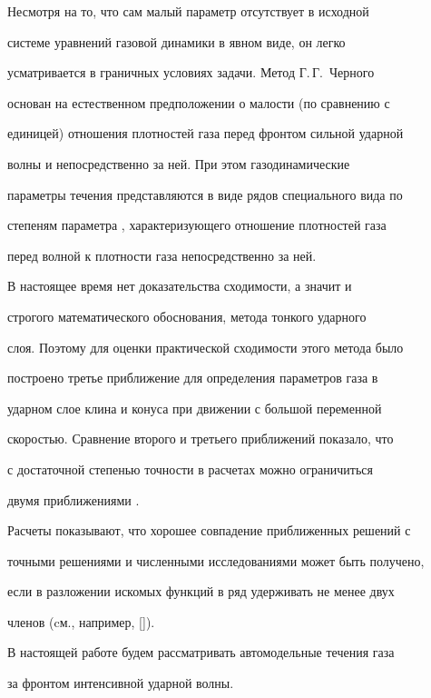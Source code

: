 Не\-смотря на то,  что сам малый параметр отсутствует в исходной


системе уравнений газовой динамики в явном виде,  он легко


усматривается в граничных условиях задачи. Метод Г.\,Г.~Черного


основан на естественном предположении о малости (по сравнению с


единицей) отношения плотностей газа перед фронтом сильной ударной


волны и непосредственно за ней. При этом газодинамические


параметры течения представляются в виде рядов специального вида по


степеням параметра ,  характеризующего отношение плотностей газа


перед волной к плотности газа непосредственно за ней.





В настоящее время нет доказательства сходимости,  а значит и


строгого математического обоснования,  метода тонкого ударного


слоя. Поэтому для оценки практической сходимости этого метода было


построено третье приближение для определения параметров газа в


ударном слое клина и конуса при движении с большой переменной


скоростью. Сравнение второго и третьего приближений показало,  что


с достаточной степенью точности в расчетах можно ограничиться


двумя приближениями \cite{Potekhina}.





Расчеты показывают,  что хорошее совпадение приближенных решений с


точными решениями и численными исследованиями может быть получено,


если в разложении искомых функций в ряд удерживать не менее двух


членов (cм.,  например,  []).





В настоящей работе будем рассматривать автомодельные течения газа


за фронтом интенсивной ударной волны.





